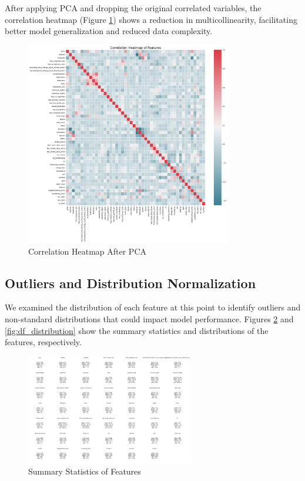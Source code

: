 \documentclass[12pt]{article}
\begin{document}
After applying PCA and dropping the original correlated variables, the correlation heatmap (Figure \ref{fig:correlation_after}) shows a reduction in multicollinearity, facilitating better model generalization and reduced data complexity.

\begin{figure}[H]
\centering
\includegraphics[width=0.8\textwidth]{images/correlation_after.png}
\caption{Correlation Heatmap After PCA}
\label{fig:correlation_after}
\end{figure}

\subsection{Outliers and Distribution Normalization}

We examined the distribution of each feature at this point to identify outliers and non-standard distributions that could impact model performance. Figures \ref{fig:df_describe} and \ref{fig:df_distribution} show the summary statistics and distributions of the features, respectively.

\begin{figure}[H]
\centering
\includegraphics[width=0.65\textwidth]{images/df_describe.png}
\caption{Summary Statistics of Features}
\label{fig:df_describe}
\end{figure}
\end{document}
